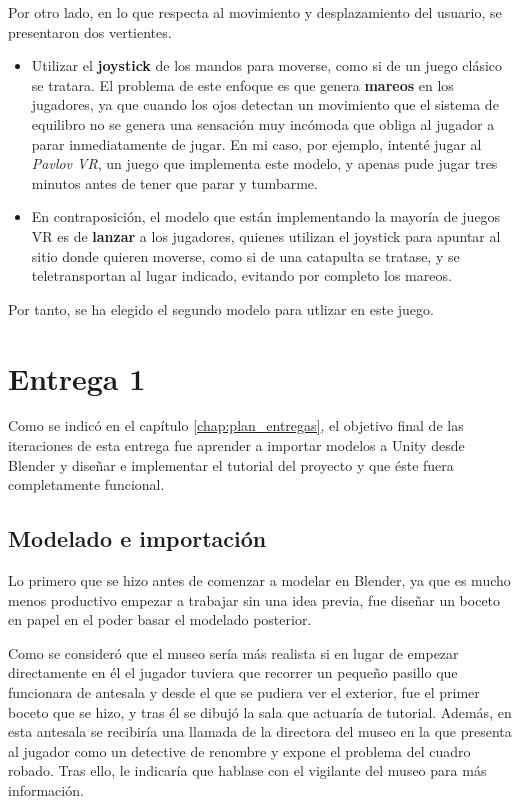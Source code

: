 Por otro lado, en lo que respecta al movimiento y desplazamiento del usuario, se presentaron dos vertientes.

\begin{itemize}
    \item Utilizar el \textbf{joystick} de los mandos para moverse, como si de un juego clásico se tratara. El problema de este enfoque es que genera \textbf{mareos} en los jugadores, ya que cuando los ojos detectan un movimiento que el sistema de equilibro no se genera una sensación muy incómoda que obliga al jugador a parar inmediatamente de jugar. En mi caso, por ejemplo, intenté jugar al \textit{Pavlov VR}, un juego que implementa este modelo, y apenas pude jugar tres minutos antes de tener que parar y tumbarme.
    
    \item En contraposición, el modelo que están implementando la mayoría de juegos \acs{VR} es de \textbf{lanzar} a los jugadores, quienes utilizan el joystick para apuntar al sitio donde quieren moverse, como si de una catapulta se tratase, y se teletransportan al lugar indicado, evitando por completo los mareos. 
\end{itemize}

Por tanto, se ha elegido el segundo modelo para utlizar en este juego.

\section{Entrega 1}

Como se indicó en el capítulo \ref{chap:plan_entregas}, el objetivo final de las iteraciones de esta entrega fue aprender a importar modelos a Unity desde Blender y diseñar e implementar el tutorial del proyecto y que éste fuera completamente funcional. 

\subsection{Modelado e importación}

Lo primero que se hizo antes de comenzar a modelar en Blender, ya que es mucho menos productivo empezar a trabajar sin una idea previa, fue diseñar un boceto en papel en el poder basar el modelado posterior.

Como se consideró que el museo sería más realista si en lugar de empezar directamente en él el jugador tuviera que recorrer un pequeño pasillo que funcionara de antesala y desde el que se pudiera ver el exterior, fue el primer boceto que se hizo, y tras él se dibujó la sala que actuaría de tutorial. Además, en esta antesala se recibiría una llamada de la directora del museo en la que presenta al jugador como un detective de renombre y expone el problema del cuadro robado. Tras ello, le indicaría que hablase con el vigilante del museo para más información.

